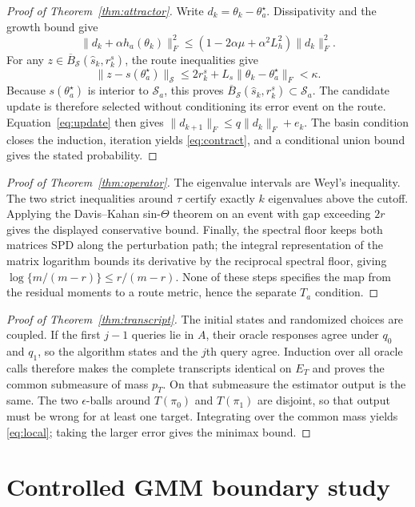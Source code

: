\documentclass[11pt]{article}
\theoremstyle{plain}
\theoremstyle{definition}
\theoremstyle{remark}
\begin{document}
\begin{proof}[Proof of Theorem~\ref{thm:attractor}]
Write $d_k=\theta_k-\theta_a^\star$. Dissipativity and the growth bound
give
\[
 \|d_k+\alpha h_a(\theta_k)\|_F^2
 \le(1-2\alpha\mu+\alpha^2L_h^2)\|d_k\|_F^2.
\]
For any $z\in\overline B_{\mathcal S}(\widehat s_k,r_k^s)$, the route
inequalities give
\[
\|z-s(\theta_a^\star)\|_{\mathcal S}
\le2r_k^s+L_s\|\theta_k-\theta_a^\star\|_F<\kappa.
\]
Because $s(\theta_a^\star)$ is interior to $\mathcal S_a$, this proves
$\overline B_{\mathcal S}(\widehat s_k,r_k^s)\subset\mathcal S_a$. The
candidate update is therefore
selected without conditioning its error event on the route.
Equation~\eqref{eq:update} then gives
$\|d_{k+1}\|_F\le q\|d_k\|_F+e_k$. The basin condition closes the induction,
iteration yields \eqref{eq:contract}, and a conditional union bound gives the
stated probability.
\end{proof}

\begin{proof}[Proof of Theorem~\ref{thm:operator}]
The eigenvalue intervals are Weyl's inequality. The two strict inequalities
around $\tau$ certify exactly $k$ eigenvalues above the cutoff. Applying the
Davis--Kahan sin-$\Theta$ theorem on an event with gap exceeding $2r$ gives the
displayed conservative bound. Finally, the spectral floor keeps both matrices
SPD along the perturbation path; the integral representation of the matrix
logarithm bounds its derivative by the reciprocal spectral floor, giving
$\log\{m/(m-r)\}\le r/(m-r)$. None of these steps specifies the map from the
residual moments to a route metric, hence the separate $T_a$ condition.
\end{proof}

\begin{proof}[Proof of Theorem~\ref{thm:transcript}]
The initial states and randomized choices are coupled. If the first $j-1$
queries lie in $A$, their oracle responses agree under $q_0$ and $q_1$, so the
algorithm states and the $j$th query agree. Induction over all oracle calls
therefore makes the complete transcripts identical on $E_T$ and proves
the common submeasure of mass $p_T$. On that submeasure the estimator
output is the same. The two $\epsilon$-balls around $T(\pi_0)$ and $T(\pi_1)$
are disjoint, so that output must be wrong for at least one target. Integrating
over the common mass yields \eqref{eq:local}; taking the larger error gives the
minimax bound.
\end{proof}

\section{Controlled GMM boundary study}\label{app:gmm-boundary}
\end{document}
